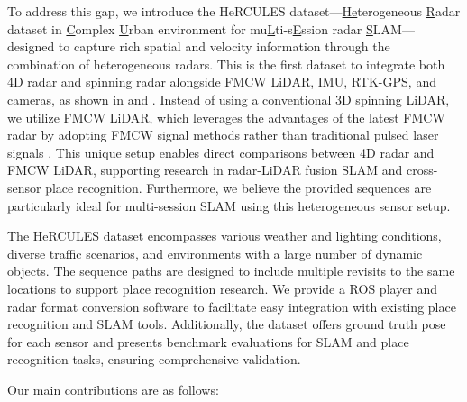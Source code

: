 To address this gap, we introduce the HeRCULES dataset—\underline{He}terogeneous \underline{R}adar dataset in \underline{C}omplex \underline{U}rban environment for mu\underline{L}ti-s\underline{E}ssion radar \underline{S}LAM—designed to capture rich spatial and velocity information through the combination of heterogeneous radars. This is the first dataset to integrate both 4D radar and spinning radar alongside \ac{FMCW} \ac{LiDAR}, \ac{IMU}, RTK-GPS, and cameras, as shown in  and . Instead of using a conventional 3D spinning \ac{LiDAR}, we utilize \ac{FMCW} \ac{LiDAR}, which leverages the advantages of the latest \ac{FMCW} radar by adopting \ac{FMCW} signal methods rather than traditional pulsed laser signals \cite{sayyah2022fully, kim2020fmcw, xu2019fmcw}. This unique setup enables direct comparisons between 4D radar and \ac{FMCW} \ac{LiDAR}, supporting research in radar-\ac{LiDAR} fusion \ac{SLAM} and cross-sensor place recognition. Furthermore, we believe the provided sequences are particularly ideal for multi-session \ac{SLAM} using this heterogeneous sensor setup.

The HeRCULES dataset encompasses various weather and lighting conditions, diverse traffic scenarios, and environments with a large number of dynamic objects. The sequence paths are designed to include multiple revisits to the same locations to support place recognition research. We provide a \ac{ROS} player and radar format conversion software to facilitate easy integration with existing place recognition and SLAM tools. Additionally, the dataset offers ground truth pose for each sensor and presents benchmark evaluations for \ac{SLAM} and place recognition tasks, ensuring comprehensive validation.

Our main contributions are as follows:


